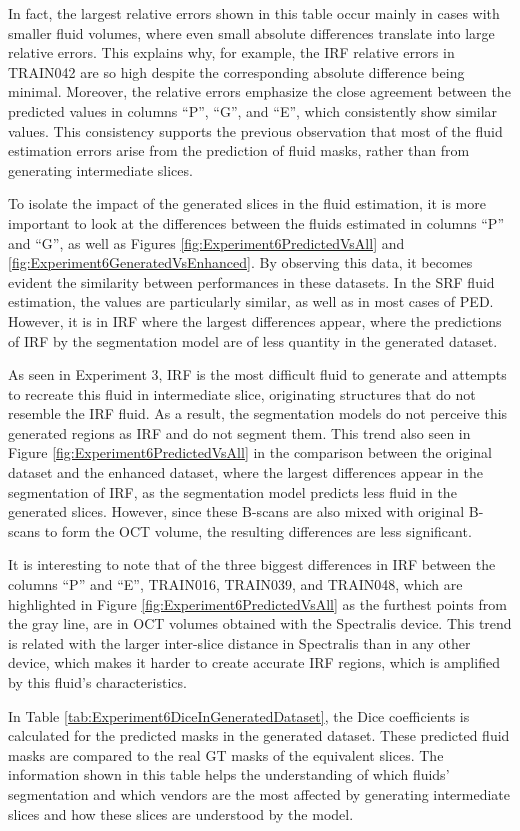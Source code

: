 \par
In fact, the largest relative errors shown in this table occur mainly in cases with smaller fluid volumes, where even small absolute differences translate into large relative errors. This explains why, for example, the IRF relative errors in TRAIN042 are so high despite the corresponding absolute difference being minimal. Moreover, the relative errors emphasize the close agreement between the predicted values in columns ``P'', ``G'', and ``E'', which consistently show similar values. This consistency supports the previous observation that most of the fluid estimation errors arise from the prediction of fluid masks, rather than from generating intermediate slices.
\par
To isolate the impact of the generated slices in the fluid estimation, it is more important to look at the differences between the fluids estimated in columns ``P'' and ``G'', as well as Figures \ref{fig:Experiment6PredictedVsAll} and \ref{fig:Experiment6GeneratedVsEnhanced}. By observing this data, it becomes evident the similarity between performances in these datasets. In the SRF fluid estimation, the values are particularly similar, as well as in most cases of PED. However, it is in IRF where the largest differences appear, where the predictions of IRF by the segmentation model are of less quantity in the generated dataset.
\par
As seen in Experiment 3, IRF is the most difficult fluid to generate and attempts to recreate this fluid in intermediate slice, originating structures that do not resemble the IRF fluid. As a result, the segmentation models do not perceive this generated regions as IRF and do not segment them. This trend also seen in Figure \ref{fig:Experiment6PredictedVsAll} in the comparison between the original dataset and the enhanced dataset, where the largest differences appear in the segmentation of IRF, as the segmentation model predicts less fluid in the generated slices. However, since these B-scans are also mixed with original B-scans to form the OCT volume, the resulting differences are less significant.
\par
It is interesting to note that of the three biggest differences in IRF between the columns ``P'' and ``E'', TRAIN016, TRAIN039, and TRAIN048, which are highlighted in Figure \ref{fig:Experiment6PredictedVsAll} as the furthest points from the gray line, are in OCT volumes obtained with the Spectralis device. This trend is related with the larger inter-slice distance in Spectralis than in any other device, which makes it harder to create accurate IRF regions, which is amplified by this fluid's characteristics.
\par
In Table \ref{tab:Experiment6DiceInGeneratedDataset}, the Dice coefficients is calculated for the predicted masks in the generated dataset. These predicted fluid masks are compared to the real GT masks of the equivalent slices. The information shown in this table helps the understanding of which fluids' segmentation and which vendors are the most affected by generating intermediate slices and how these slices are understood by the model.

